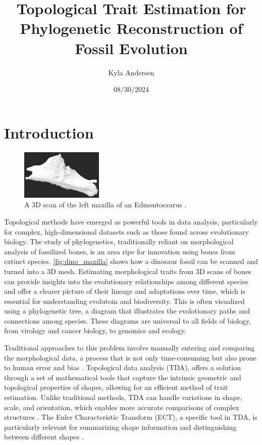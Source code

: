 \documentclass[12pt]{article}
\begin{document}
\title{Topological Trait Estimation for Phylogenetic Reconstruction of Fossil
Evolution}
\author{Kyla Andersen}
\date{08/30/2024}
\maketitle

\doublespacing

\section{Introduction}
\begin{figure}
	\centering
	\vspace{-12pt}
	\includegraphics[width=0.35\textwidth]{newDinoBone.png}
	\caption{A  3D scan of the left maxilla of an Edmontosaurus \citep{organ2024}.}
	\label{fig:dino_maxilla}
\end{figure}
\vspace{-15pt}

Topological methods have emerged as powerful tools in data analysis,
particularly for complex, high-dimensional datasets such as those found across
evolutionary biology. The study of phylogenetics, traditionally reliant on
morphological analysis of fossilized bones, is an area ripe for innovation
using bones from extinct species. \autoref{fig:dino_maxilla} shows how a 
dinosaur fossil can be scanned and turned into a 3D mesh. Estimating 
morphological traits from 3D scans of bones can provide insights into the 
evolutionary relationships among different species and offer a clearer picture 
of their lineage and adaptations over time, which is essential for understanding
evolutoin and biodiversity. This is often visualized using a phylogenetic tree, 
a diagram that illustrates the evolotionary paths and connections among species.
These diagrams are universal to all fields of biology, from virology and cancer
biology, to genomics and ecology.

Traditional approaches to this problem involve manually entering and comparing the 
morphological data, a process that is not only time-consuming but also prone to
human error and bias \citep{bates2009,asher2022}. Topological data analysis (TDA), 
offers a solution through a set  of mathematical tools that capture the intrinsic 
geometric and topological properties of shapes, allowing for an efficient method 
of trait estimation. Unlike traditional methods, TDA can handle variations in shape, 
scale, and orientation, which enables more accurate comparisons of complex 
structures \citep{zomorodian2009}. The Euler Characteristic Transform (ECT), 
a specific tool in TDA, is particularly relevant for summarizing shape information 
and distinguishing between different shapes \citep{cisewski2023}.
\end{document}
